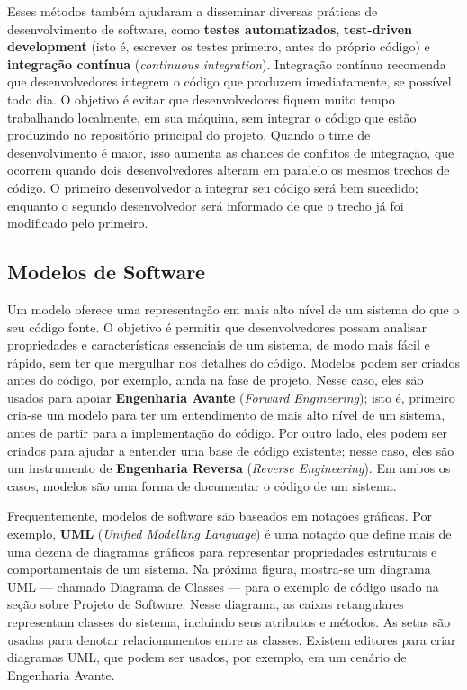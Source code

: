 \documentclass[
  11pt,
  twoside]{book}
\begin{document}
Esses métodos também ajudaram a disseminar diversas práticas de
desenvolvimento de software, como \textbf{testes automatizados},
\textbf{test-driven development} (isto é, escrever os testes primeiro,
antes do próprio código) e \textbf{integração contínua}
(\emph{continuous integration}). Integração contínua recomenda que
desenvolvedores integrem o código que produzem imediatamente, se
possível todo dia. O objetivo é evitar que desenvolvedores fiquem muito
tempo trabalhando localmente, em sua máquina, sem integrar o código que
estão produzindo no repositório principal do projeto. Quando o time de
desenvolvimento é maior, isso aumenta as chances de conflitos de
integração, que ocorrem quando dois desenvolvedores alteram em paralelo
os mesmos trechos de código. O primeiro desenvolvedor a integrar seu
código será bem sucedido; enquanto o segundo desenvolvedor será
informado de que o trecho já foi modificado pelo primeiro.

\hypertarget{modelos-de-software}{%
\subsection{Modelos de Software}\label{modelos-de-software}}

 Um modelo oferece uma representação em mais
alto nível de um sistema do que o seu código fonte. O objetivo é
permitir que desenvolvedores possam analisar propriedades e
características essenciais de um sistema, de modo mais fácil e rápido,
sem ter que mergulhar nos detalhes do código. Modelos podem ser criados
antes do código, por exemplo, ainda na fase de projeto. Nesse caso, eles
são usados para apoiar \textbf{Engenharia Avante} (\emph{Forward
Engineering}); isto é, primeiro cria-se um modelo para ter um
entendimento de mais alto nível de um sistema, antes de partir para a
implementação do código. Por outro lado, eles podem ser criados para
ajudar a entender uma base de código existente; nesse caso, eles são um
instrumento de \textbf{Engenharia Reversa} (\emph{Reverse Engineering}).
Em ambos os casos, modelos são uma forma de documentar o código de um
sistema.

 Frequentemente, modelos de software são baseados em notações
gráficas. Por exemplo, \textbf{UML} (\emph{Unified Modelling Language})
é uma notação que define mais de uma dezena de diagramas gráficos para
representar propriedades estruturais e comportamentais de um sistema. Na
próxima figura, mostra-se um diagrama UML --- chamado Diagrama de
Classes --- para o exemplo de código usado na seção sobre Projeto de
Software. Nesse diagrama, as caixas retangulares representam classes do
sistema, incluindo seus atributos e métodos. As setas são usadas para
denotar relacionamentos entre as classes. Existem editores para criar
diagramas UML, que podem ser usados, por exemplo, em um cenário de
Engenharia Avante.
\end{document}
